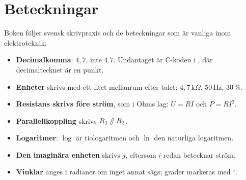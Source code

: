 \section*{Beteckningar}
Boken följer svensk skrivpraxis och de beteckningar som är vanliga inom elektroteknik:
\begin{itemize}
  \item \textbf{Decimalkomma}: $4{,}7$, inte $4.7$. Undantaget är C-koden i , där
    decimaltecknet är en punkt.
  \item \textbf{Enheter} skrivs med ett litet mellanrum efter talet: $4{,}7\,\text{k}\Omega$,
    $50\,\text{Hz}$, $30\,\%$.
  \item \textbf{Resistans skrivs före ström}, som i Ohms lag: $U = RI$ och $P = RI^2$.
  \item \textbf{Parallellkoppling} skrivs $R_1 \mathbin{/\mkern-5mu/} R_2$.
  \item \textbf{Logaritmer}: $\log$ är tiologaritmen och $\ln$ den naturliga logaritmen.
  \item \textbf{Den imaginära enheten} skrivs $j$, eftersom $i$ redan betecknar ström.
  \item \textbf{Vinklar} anges i radianer om inget annat sägs; grader markeras med $^{\circ}$.
\end{itemize}
